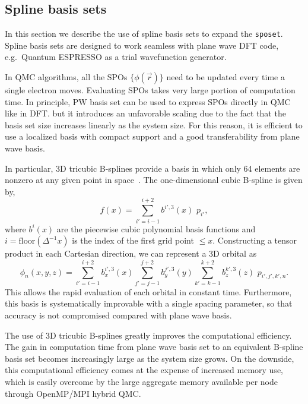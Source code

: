 \subsection{Spline basis sets}
\label{sec:spo_spline}
In this section we describe the use of spline basis sets to expand the \texttt{sposet}.
Spline basis sets are designed to work seamless with plane wave DFT code, e.g.\ Quantum ESPRESSO as a trial wavefunction generator.

In QMC algorithms, all the SPOs $\{\phi(\vec{r})\}$ need to be updated every time a single electron moves.
Evaluating SPOs takes very large portion of computation time.
In principle, PW basis set can be used to express SPOs directly in QMC like in DFT.
but it introduces an unfavorable scaling due to the fact 
that the basis set size increases linearly as the system size.
For this reason, it is efficient to use a localized basis with compact
support and a good transferability from plane wave basis. 

In particular, 3D tricubic B-splines provide a basis in which only
64 elements are nonzero at any given point in space~\cite{blips4QMC}.
The one-dimensional cubic B-spline is given by,
\begin{equation}
f(x) = \sum_{i'=i-1}^{i+2} b^{i'\!,3}(x)\,\,  p_{i'},
\label{eq:SplineFunc}
\end{equation}
where $b^{i}(x)$ are the piecewise cubic polynomial basis functions
and $i = \text{floor}(\Delta^{-1} x)$ is the index of
the first grid point $\le x$.  Constructing a tensor product in each Cartesian
direction, we can represent a 3D orbital as
\begin{equation}
  \phi_n(x,y,z) = 
  \!\!\!\!\sum_{i'=i-1}^{i+2} \!\! b_x^{i'\!,3}(x) 
  \!\!\!\!\sum_{j'=j-1}^{j+2} \!\! b_y^{j'\!,3}(y) 
  \!\!\!\!\sum_{k'=k-1}^{k+2} \!\! b_z^{k'\!,3}(z) \,\, p_{i', j', k',n}.
\label{eq:TricubicValue}
\end{equation}
This allows the rapid evaluation of each orbital in constant time.
Furthermore, this basis is systematically improvable with a single spacing
parameter, so that accuracy is not compromised compared with plane wave basis.

The use of 3D tricubic B-splines greatly improves the computational efficiency.
The gain in computation time from plane wave basis set to an equivalent B-spline basis set 
becomes increasingly large as the system size grows.
On the downside, this computational efficiency comes at
the expense of increased memory use, which is easily overcome by the large
aggregate memory available per node through OpenMP/MPI hybrid QMC.


